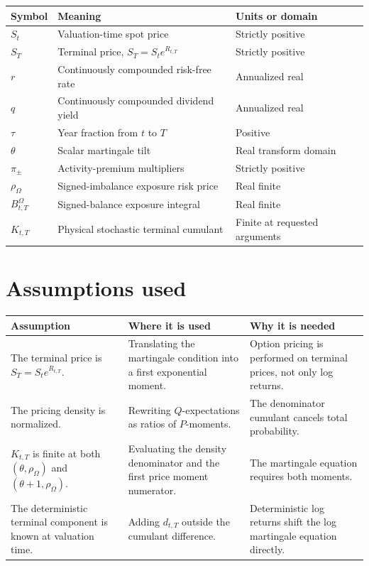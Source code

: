 \documentclass[11pt]{article}
\begin{document}
\begin{tabularx}{\textwidth}{lXX}
\toprule
Symbol & Meaning & Units or domain\\
\midrule
\(S_t\) & Valuation-time spot price & Strictly positive\\
\(S_T\) & Terminal price, \(S_T=S_t e^{R_{t,T}}\) & Strictly positive\\
\(r\) & Continuously compounded risk-free rate & Annualized real\\
\(q\) & Continuously compounded dividend yield & Annualized real\\
\(\tau\) & Year fraction from \(t\) to \(T\) & Positive\\
\(\theta\) & Scalar martingale tilt & Real transform domain\\
\(\pi_\pm\) & Activity-premium multipliers & Strictly positive\\
\(\rho_\Omega\) & Signed-imbalance exposure risk price & Real finite\\
\(B_{t,T}^{\Omega}\) & Signed-balance exposure integral & Real finite\\
\(K_{t,T}\) & Physical stochastic terminal cumulant & Finite at requested arguments\\
\bottomrule
\end{tabularx}

\section{Assumptions used}

\begin{tabularx}{\textwidth}{XXX}
\toprule
Assumption & Where it is used & Why it is needed\\
\midrule
The terminal price is \(S_T=S_t e^{R_{t,T}}\).
& Translating the martingale condition into a first exponential moment.
& Option pricing is performed on terminal prices, not only log returns.\\
The pricing density is normalized.
& Rewriting \(Q\)-expectations as ratios of \(P\)-moments.
& The denominator cumulant cancels total probability.\\
\(K_{t,T}\) is finite at both \((\theta,\rho_\Omega)\) and \((\theta+1,\rho_\Omega)\).
& Evaluating the density denominator and the first price moment numerator.
& The martingale equation requires both moments.\\
The deterministic terminal component is known at valuation time.
& Adding \(d_{t,T}\) outside the cumulant difference.
& Deterministic log returns shift the log martingale equation directly.\\
\bottomrule
\end{tabularx}
\end{document}

